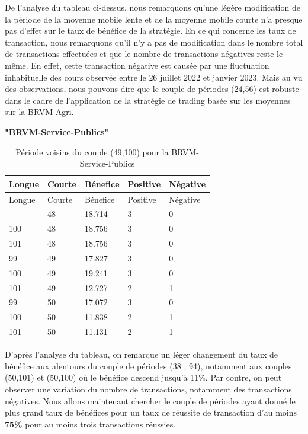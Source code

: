 \begin{itemize}
\begin{itemize}
    {De l'analyse du tableau ci-dessus, nous remarquons qu'une légère
    modification de la période de la moyenne mobile lente et de la
    moyenne mobile courte n'a presque pas d'effet sur le taux de
    bénéfice de la stratégie. En ce qui concerne les taux de
    transaction, nous remarquons qu'il n'y a pas de modification dans le
    nombre total de transactions effectuées et que le nombre de
    transactions négatives reste le même. En effet, cette transaction
    négative est causée par une fluctuation inhabituelle des cours
    observée entre le 26 juillet 2022 et janvier 2023. Mais au vu des
    observations, nous pouvons dire que le couple de périodes (24,56)
    est robuste dans le cadre de l'application de la stratégie de
    trading basée sur les moyennes sur la BRVM-Agri.}

    \textbf{"BRVM-Service-Publics"}

    \begin{longtable}[]{@{}lllll@{}}
    \caption{Période voisins du couple (49,100) pour la
    BRVM-Service-Publics}\tabularnewline
    \toprule\noalign{}
    Longue & Courte & Bénefice & Positive & Négative \\
    \midrule\noalign{}
    \endfirsthead
    \toprule\noalign{}
    Longue & Courte & Bénefice & Positive & Négative \\
    \midrule\noalign{}
    \endhead
    \bottomrule\noalign{}
    \endlastfoot
    99 & 48 & 18.714 & 3 & 0 \\
    100 & 48 & 18.756 & 3 & 0 \\
    101 & 48 & 18.756 & 3 & 0 \\
    99 & 49 & 17.827 & 3 & 0 \\
    100 & 49 & 19.241 & 3 & 0 \\
    101 & 49 & 12.727 & 2 & 1 \\
    99 & 50 & 17.072 & 3 & 0 \\
    100 & 50 & 11.838 & 2 & 1 \\
    101 & 50 & 11.131 & 2 & 1 \\
    \end{longtable}

    {D'après l'analyse du tableau, on remarque un léger changement du
    taux de bénéfice aux alentours du couple de périodes (38 ; 94),
    notamment aux couples (50,101) et (50,100) où le bénéfice descend
    jusqu'à 11\%. Par contre, on peut observer une variation du nombre
    de transactions, notamment des transactions négatives. Nous allons
    maintenant chercher le couple de périodes ayant donné le plus grand
    taux de bénéfices pour un taux de réussite de transaction d'au moins
    \textbf{75\%} pour au moins trois transactions réussies.}


\end{itemize}
\end{itemize}
